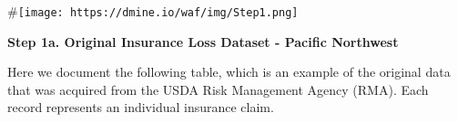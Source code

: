 \documentclass[]{article}
\newenvironment{Shaded}{\begin{snugshade}}{\end{snugshade}}
\newcommand{\DataTypeTok}[1]{\textcolor[rgb]{0.13,0.29,0.53}{#1}}
\newcommand{\DecValTok}[1]{\textcolor[rgb]{0.00,0.00,0.81}{#1}}
\newcommand{\KeywordTok}[1]{\textcolor[rgb]{0.13,0.29,0.53}{\textbf{#1}}}
\newcommand{\NormalTok}[1]{#1}
\newcommand{\OperatorTok}[1]{\textcolor[rgb]{0.81,0.36,0.00}{\textbf{#1}}}
\newcommand{\StringTok}[1]{\textcolor[rgb]{0.31,0.60,0.02}{#1}}
\begin{document}
\#\texttt{[image: https://dmine.io/waf/img/Step1.png]}

\textbf{Step 1a. Original Insurance Loss Dataset - Pacific Northwest}

Here we document the following table, which is an example of the
original data that was acquired from the USDA Risk Management Agency
(RMA). Each record represents an individual insurance claim.

\begin{Shaded}
\end{Shaded}
\end{document}
